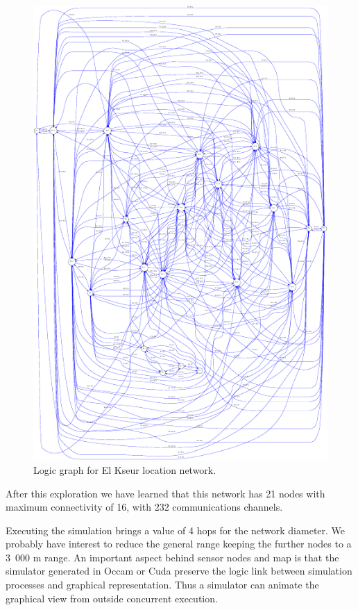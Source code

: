 \begin{figure}
\begin{center}
\includegraphics[width=12cm]{soummam2.pdf}
\caption{Logic graph for El Kseur location network.}
\label{fig:soummamGraph}
\end{center}
\end{figure}



After this exploration we have learned that this network has 21 nodes with maximum 
connectivity of 16, with 232 communications channels.

Executing the simulation brings a value of 4 hops for the network diameter. 
We probably have interest to reduce the general range keeping the further nodes to 
a 3~000 m range. 
An important aspect behind sensor nodes and map is that the simulator generated 
in Occam or Cuda preserve the logic link between simulation processes and 
graphical representation. Thus a simulator can animate the graphical view 
from outside concurrent execution. 



